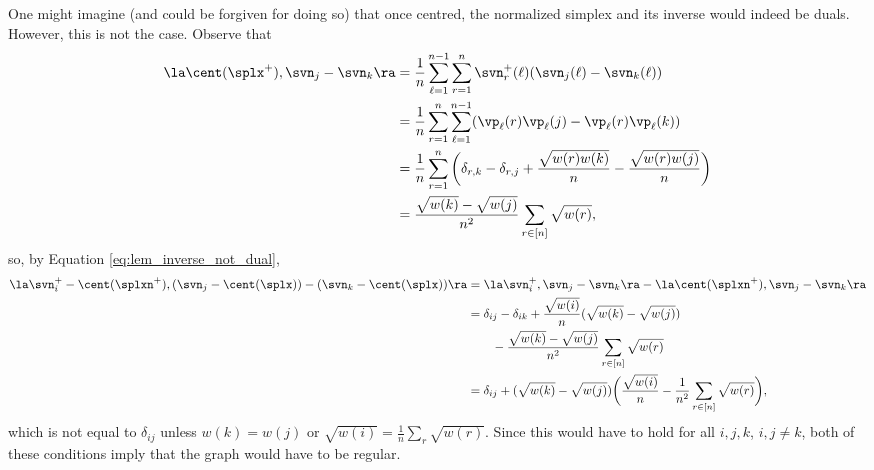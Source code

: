 One might imagine (and could be forgiven for doing so) that once centred, the normalized simplex and its inverse would indeed be duals. However, this is not the case. Observe that 
\begin{align*}
\la \cent(\splx^+),\svn_j-\svn_k\ra &= \frac{1}{n}\sum_{\ell=1}^{n-1} \sum_{r=1}^n \svn^+_r(\ell)(\svn_j(\ell)-\svn_k(\ell))  \\&= 
\frac{1}{n}\sum_{r=1}^n \sum_{\ell=1}^{n-1} (\vp_\ell(r)\vp_\ell(j) - \vp_\ell(r)\vp_\ell(k) ) \\
&= \frac{1}{n} \sum_{r=1}^n \bigg(\delta_{r,k} - \delta_{r,j} + \frac{\sqrt{w(r)w(k)}}{n} - \frac{\sqrt{w(r)w(j)}}{n}\bigg) \\
&= \frac{\sqrt{w(k)}-\sqrt{w(j)}}{n^2} \sum_{r\in[n]}\sqrt{w(r)},
\end{align*}
so, by Equation \eqref{eq:lem_inverse_not_dual},
\begin{align*}
\la \svn_i^+-\cent(\splxn^+),(\svn_j-\cent(\splx)) - (\svn_k-\cent(\splx))\ra &= \la \svn_i^+,\svn_j-\svn_k\ra - \la \cent(\splxn^+),\svn_j-\svn_k\ra \\
&= \delta_{ij} - \delta_{ik} + \frac{\sqrt{w(i)}}{n}(\sqrt{w(k)} - \sqrt{w(j)})  \\
&\qquad - \frac{\sqrt{w(k)}-\sqrt{w(j)}}{n^2} \sum_{r\in[n]}\sqrt{w(r)} \\
&= \delta_{ij} + (\sqrt{w(k)}-\sqrt{w(j)})\bigg(\frac{\sqrt{w(i)}}{n} - \frac{1}{n^2}\sum_{r\in[n]}\sqrt{w(r)}\bigg),
\end{align*}
which is not equal to $\delta_{ij}$ unless $w(k)=w(j)$ or $\sqrt{w(i)}= \frac{1}{n}\sum_r \sqrt{w(r)}$. Since this would have to hold for all $i,j,k$, $i,j\neq k$, both of these conditions imply that the graph would have to be regular. 

